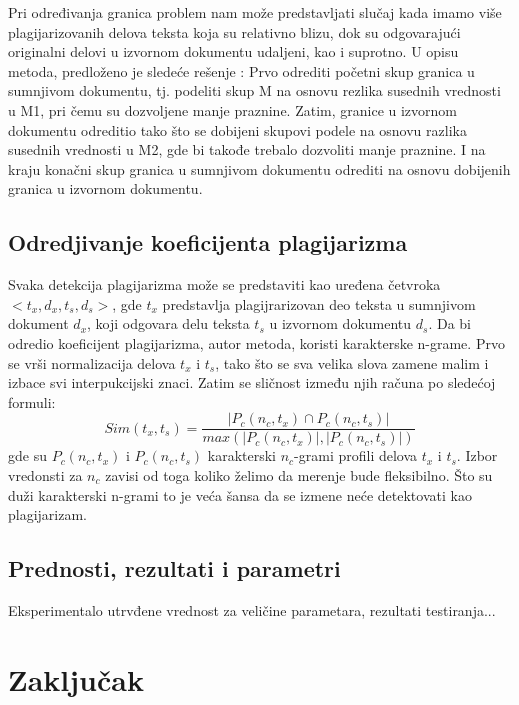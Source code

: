 \documentclass[a4paper]{article}
\begin{document}
\par Pri određivanja granica problem nam može predstavljati slučaj kada imamo više plagijarizovanih delova teksta koja su relativno  blizu, dok su 
odgovarajući originalni delovi u izvornom dokumentu udaljeni, kao i suprotno. U opisu metoda, predloženo je sledeće rešenje \cite{stamatatos} : Prvo odrediti početni 
skup granica u sumnjivom dokumentu, tj. podeliti skup M na osnovu rezlika susednih vrednosti u M1, pri čemu su dozvoljene manje praznine. Zatim, granice 
u izvornom dokumentu odreditio tako što se dobijeni  skupovi podele na osnovu razlika susednih vrednosti u M2, gde bi takođe trebalo dozvoliti manje 
praznine. I na kraju konačni  skup granica u sumnjivom dokumentu odrediti na osnovu dobijenih granica u izvornom dokumentu.    

\subsection{Odredjivanje koeficijenta plagijarizma}
\label{subsec:odredjivanje koeficijenta plagijarizma}

Svaka detekcija plagijarizma može se predstaviti kao uređena četvroka \( <t_{x}, d_{x}, t_{s}, d_{s}>\), gde \(t_{x}\) predstavlja  plagijrarizovan deo teksta u sumnjivom 
dokument \(d_{x}\), koji odgovara delu teksta \(t_{s}\) u izvornom dokumentu \(d_{s}\). Da bi odredio  koeficijent plagijarizma, autor metoda, koristi karakterske n-grame. 
Prvo se vrši normalizacija delova \(t_{x}\) i \(t_{s}\), tako što se  sva velika slova zamene malim i izbace svi interpukcijski znaci. Zatim se sličnost između njih
računa po sledećoj formuli:
\[ Sim(t_{x},t_{s}) = \frac{|P_{c}(n_{c},t_{x}) \cap P_{c}(n_{c},t_{s})|}{max(|P_{c}(n_{c},t_{x})|,|P_{c}(n_{c},t_{s})|)} \]			
gde su \(P_{c}(n_{c},t_{x})\) i \(P_{c}(n_{c},t_{s})\) karakterski \(n_{c}\)-grami profili delova \(t_{x}\) i \(t_{s}\). Izbor vredonsti za \(n_{c}\) zavisi od toga koliko želimo da merenje bude fleksibilno. Što su duži karakterski n-grami to je veća šansa da se izmene neće detektovati kao plagijarizam.

\subsection{Prednosti, rezultati i parametri}
\label{subsec:Prednosti, rezultati i parametri}

Eksperimentalo utrvđene vrednost za veličine parametara, rezultati testiranja... 

\section{Zaključak}
\label{sec:zakljucak}
\end{document}
